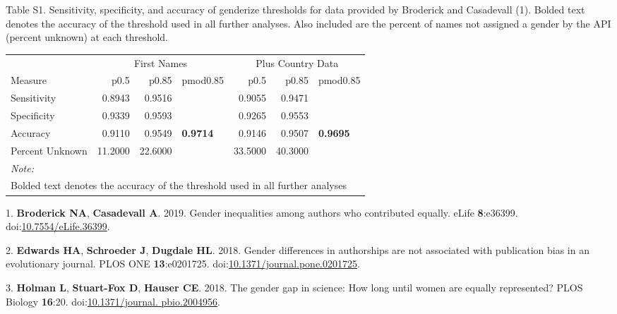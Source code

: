 \documentclass[11pt,]{article}
\begin{document}
\vspace{40mm}

Table S1. Sensitivity, specificity, and accuracy of genderize thresholds
for data provided by Broderick and Casadevall (1). Bolded text denotes
the accuracy of the threshold used in all further analyses. Also
included are the percent of names not assigned a gender by the API
(percent unknown) at each threshold.

\begin{table}[H]
\centering
\begin{tabular}{l|r|r|l|r|r|l}
\hline
\multicolumn{1}{c|}{ } & \multicolumn{3}{c|}{First Names} & \multicolumn{3}{c}{Plus Country Data} \\
\cline{2-4} \cline{5-7}
Measure & p0.5 & p0.85 & pmod0.85 & p0.5 & p0.85 & pmod0.85\\
\hline
Sensitivity & 0.8943 & 0.9516 & \cellcolor{white}{0.971} & 0.9055 & 0.9471 & \cellcolor{white}{0.9669}\\
\hline
Specificity & 0.9339 & 0.9593 & \cellcolor{white}{0.972} & 0.9265 & 0.9553 & \cellcolor{white}{0.9727}\\
\hline
Accuracy & 0.9110 & 0.9549 & \textbf{0.9714} & 0.9146 & 0.9507 & \textbf{0.9695}\\
\hline
Percent Unknown & 11.2000 & 22.6000 & \cellcolor{white}{34.6} & 33.5000 & 40.3000 & \cellcolor{white}{58.7}\\
\hline
\multicolumn{7}{l}{\textit{Note: }}\\
\multicolumn{7}{l}{Bolded text denotes the accuracy of the threshold used in all further analyses}\\
\end{tabular}
\end{table}

\hypertarget{refs}{}
\hypertarget{ref-broderick_gender_2019}{}
1. \textbf{Broderick NA}, \textbf{Casadevall A}. 2019. Gender
inequalities among authors who contributed equally. eLife
\textbf{8}:e36399.
doi:\href{https://doi.org/10.7554/eLife.36399}{10.7554/eLife.36399}.

\hypertarget{ref-edwards_gender_2018}{}
2. \textbf{Edwards HA}, \textbf{Schroeder J}, \textbf{Dugdale HL}. 2018.
Gender differences in authorships are not associated with publication
bias in an evolutionary journal. PLOS ONE \textbf{13}:e0201725.
doi:\href{https://doi.org/10.1371/journal.pone.0201725}{10.1371/journal.pone.0201725}.

\hypertarget{ref-holman_gender_2018}{}
3. \textbf{Holman L}, \textbf{Stuart-Fox D}, \textbf{Hauser CE}. 2018.
The gender gap in science: How long until women are equally represented?
PLOS Biology \textbf{16}:20.
doi:\href{https://doi.org/10.1371/journal.\%20pbio.2004956}{10.1371/journal. pbio.2004956}.
\end{document}

